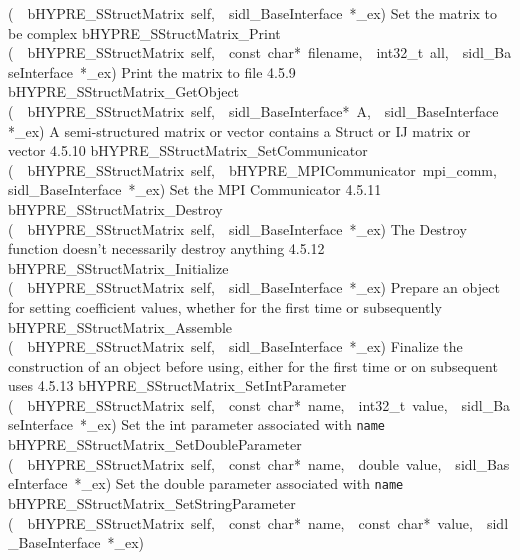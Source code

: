 \documentclass{article}
\begin{document}
\begin{cxxentry}
\begin{cxxentry}
\begin{cxxnames}
        {(\ \ bHYPRE\_SStructMatrix\ self,\ \ sidl\_BaseInterface\ *\_ex)}
        {
Set the matrix to be complex}
        {}
\label{cxx.4.5.21}
        {bHYPRE\_SStructMatrix\_Print}
        {(\ \ bHYPRE\_SStructMatrix\ self,\ \ const\ char*\ filename,\ \ int32\_t\ all,\ \ sidl\_BaseInterface\ *\_ex)}
        {
Print the matrix to file}
        {4.5.9}
        {bHYPRE\_SStructMatrix\_GetObject}
        {(\ \ bHYPRE\_SStructMatrix\ self,\ \ sidl\_BaseInterface*\ A,\ \ sidl\_BaseInterface\ *\_ex)}
        {
A semi-structured matrix or vector contains a Struct or IJ matrix
or vector}
        {4.5.10}
        {bHYPRE\_SStructMatrix\_SetCommunicator}
        {(\ \ bHYPRE\_SStructMatrix\ self,\ \ bHYPRE\_MPICommunicator\ mpi\_comm,\ \ sidl\_BaseInterface\ *\_ex)}
        {
Set the MPI Communicator}
        {4.5.11}
        {bHYPRE\_SStructMatrix\_Destroy}
        {(\ \ bHYPRE\_SStructMatrix\ self,\ \ sidl\_BaseInterface\ *\_ex)}
        {
The Destroy function doesn't necessarily destroy anything}
        {4.5.12}
        {bHYPRE\_SStructMatrix\_Initialize}
        {(\ \ bHYPRE\_SStructMatrix\ self,\ \ sidl\_BaseInterface\ *\_ex)}
        {
Prepare an object for setting coefficient values, whether for
the first time or subsequently}
        {}
\label{cxx.4.5.22}
        {bHYPRE\_SStructMatrix\_Assemble}
        {(\ \ bHYPRE\_SStructMatrix\ self,\ \ sidl\_BaseInterface\ *\_ex)}
        {
Finalize the construction of an object before using, either
for the first time or on subsequent uses}
        {4.5.13}
        {bHYPRE\_SStructMatrix\_SetIntParameter}
        {(\ \ bHYPRE\_SStructMatrix\ self,\ \ const\ char*\ name,\ \ int32\_t\ value,\ \ sidl\_BaseInterface\ *\_ex)}
        {
Set the int parameter associated with {\tt name}}
        {}
\label{cxx.4.5.23}
        {bHYPRE\_SStructMatrix\_SetDoubleParameter}
        {(\ \ bHYPRE\_SStructMatrix\ self,\ \ const\ char*\ name,\ \ double\ value,\ \ sidl\_BaseInterface\ *\_ex)}
        {
Set the double parameter associated with {\tt name}}
        {}
\label{cxx.4.5.24}
        {bHYPRE\_SStructMatrix\_SetStringParameter}
        {(\ \ bHYPRE\_SStructMatrix\ self,\ \ const\ char*\ name,\ \ const\ char*\ value,\ \ sidl\_BaseInterface\ *\_ex)}

\end{cxxnames}
\end{cxxentry}
\end{cxxentry}
\end{document}
